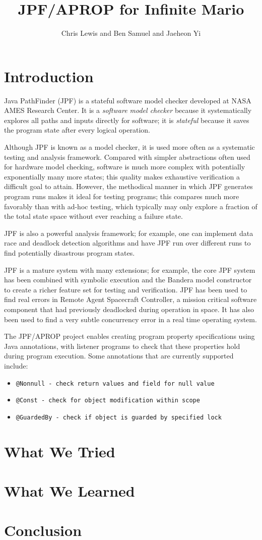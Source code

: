 \documentclass{article}
\title{JPF/APROP for Infinite Mario}
\author{Chris Lewis and Ben Samuel and Jaeheon Yi}
\begin{document}
\maketitle

\section{Introduction}
Java PathFinder (JPF) is a stateful software model checker developed at NASA AMES Research Center. 
It is a \emph{software model checker} because it systematically explores all paths and inputs directly for software;
it is \emph{stateful} because it saves the program state after every logical operation. 

Although JPF is known as a model checker, it is used more often as a systematic testing and analysis framework. 
Compared with simpler abstractions often used for hardware model checking, software is much more complex with potentially exponentially many more states;
this quality makes exhaustive verification a difficult goal to attain. 
However, the methodical manner in which JPF generates program runs makes it ideal for testing programs; 
this compares much more favorably than with ad-hoc testing, which typically may only explore a fraction of the total state space without ever reaching a failure state. 

JPF is also a powerful analysis framework; for example, one can implement data race and deadlock detection algorithms and have JPF run over different runs to find potentially disastrous program states. 

JPF is a mature system with many extensions; for example, the core JPF system has been combined with symbolic execution and the Bandera model constructor to create a richer feature set for testing and verification. 
JPF has been used to find real errors in Remote Agent Spacecraft Controller, a mission critical software component that had previously deadlocked during operation in space. 
It has also been used to find a very subtle concurrency error in a real time operating system. 

The JPF/APROP project enables creating program property specifications using Java annotations, with listener programs to check that these properties hold during program execution. 
Some annotations that are currently supported include:
\begin{itemize}
\item \tt{@Nonnull} - check 	return values and field for null value
\item \tt{@Const} - check for object modification within scope
\item \tt{@GuardedBy} - check if object is guarded by specified lock
\end{itemize}

\section{What We Tried}

\section{What We Learned}

\section{Conclusion}
\end{document}
